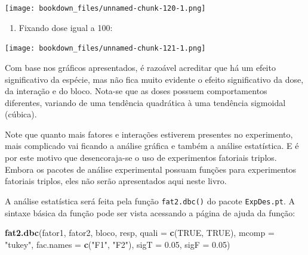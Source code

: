 \documentclass[
]{article}
\newenvironment{Shaded}{\begin{snugshade}}{\end{snugshade}}
\newcommand{\DataTypeTok}[1]{\textcolor[rgb]{0.13,0.29,0.53}{#1}}
\newcommand{\DecValTok}[1]{\textcolor[rgb]{0.00,0.00,0.81}{#1}}
\newcommand{\FloatTok}[1]{\textcolor[rgb]{0.00,0.00,0.81}{#1}}
\newcommand{\KeywordTok}[1]{\textcolor[rgb]{0.13,0.29,0.53}{\textbf{#1}}}
\newcommand{\NormalTok}[1]{#1}
\newcommand{\OperatorTok}[1]{\textcolor[rgb]{0.81,0.36,0.00}{\textbf{#1}}}
\newcommand{\OtherTok}[1]{\textcolor[rgb]{0.56,0.35,0.01}{#1}}
\newcommand{\StringTok}[1]{\textcolor[rgb]{0.31,0.60,0.02}{#1}}
\providecommand{\tightlist}{%
  \setlength{\itemsep}{0pt}\setlength{\parskip}{0pt}}
\begin{document}
\texttt{[image: bookdown\_files/unnamed-chunk-120-1.png]}

\begin{enumerate}
\def\labelenumi{\arabic{enumi}.}
\setcounter{enumi}{11}
\tightlist
\item
  Fixando dose igual a 100:
\end{enumerate}

\begin{Shaded}
\end{Shaded}

\texttt{[image: bookdown\_files/unnamed-chunk-121-1.png]}

Com base nos gráficos apresentados, é razoável acreditar que há um efeito significativo da espécie, mas não fica muito evidente o efeito significativo da dose, da interação e do bloco. Nota-se que as doses possuem comportamentos diferentes, variando de uma tendência quadrática à uma tendência sigmoidal (cúbica).

Note que quanto mais fatores e interações estiverem presentes no experimento, mais complicado vai ficando a análise gráfica e também a análise estatística. E é por este motivo que desencoraja-se o uso de experimentos fatoriais triplos. Embora os pacotes de análise experimental possuam funções para experimentos fatoriais triplos, eles não serão apresentados aqui neste livro.

A análise estatística será feita pela função \texttt{fat2.dbc()} do pacote \texttt{ExpDes.pt}. A sintaxe básica da função pode ser vista acessando a página de ajuda da função:

\begin{Shaded}
\begin{Highlighting}[]
\KeywordTok{fat2.dbc}\NormalTok{(fator1, fator2, bloco, resp, }\DataTypeTok{quali =} \KeywordTok{c}\NormalTok{(}\OtherTok{TRUE}\NormalTok{, }\OtherTok{TRUE}\NormalTok{), }
         \DataTypeTok{mcomp =} \StringTok{"tukey"}\NormalTok{, }\DataTypeTok{fac.names =} \KeywordTok{c}\NormalTok{(}\StringTok{"F1"}\NormalTok{, }\StringTok{"F2"}\NormalTok{), }
         \DataTypeTok{sigT =} \FloatTok{0.05}\NormalTok{, }\DataTypeTok{sigF =} \FloatTok{0.05}\NormalTok{)}
\end{Highlighting}
\end{Shaded}
\end{document}
